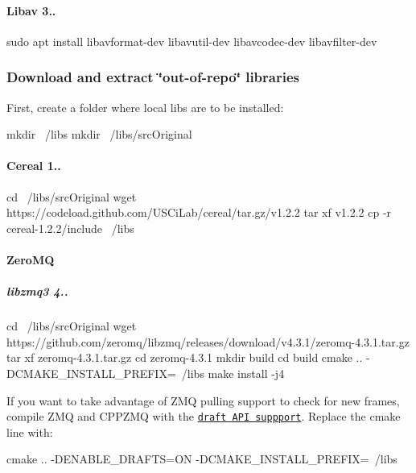  \paragraph*{Libav 3..}


\begin{DoxyCode}
sudo apt install libavformat-dev libavutil-dev libavcodec-dev libavfilter-dev
\end{DoxyCode}


\subsubsection*{Download and extract \char`\"{}out-\/of-\/repo\char`\"{} libraries}

First, create a folder where local libs are to be installed\+:


\begin{DoxyCode}
mkdir ~/libs
mkdir ~/libs/srcOriginal
\end{DoxyCode}


\paragraph*{Cereal 1..}


\begin{DoxyCode}
cd ~/libs/srcOriginal
wget https://codeload.github.com/USCiLab/cereal/tar.gz/v1.2.2
tar xf v1.2.2
cp -r cereal-1.2.2/include ~/libs
\end{DoxyCode}


\paragraph*{Zero\+MQ}

\subparagraph*{libzmq3 4..}


\begin{DoxyCode}
cd ~/libs/srcOriginal
wget https://github.com/zeromq/libzmq/releases/download/v4.3.1/zeromq-4.3.1.tar.gz
tar xf zeromq-4.3.1.tar.gz
cd zeromq-4.3.1
mkdir build
cd build
cmake .. -DCMAKE\_INSTALL\_PREFIX=~/libs
make install -j4
\end{DoxyCode}


If you want to take advantage of Z\+MQ pulling support to check for new frames, compile Z\+MQ and C\+P\+P\+Z\+MQ with the \href{https://github.com/zeromq/cppzmq/issues/175}{\tt draft A\+PI suppport}. Replace the cmake line with\+:


\begin{DoxyCode}
cmake .. -DENABLE\_DRAFTS=ON -DCMAKE\_INSTALL\_PREFIX=~/libs
\end{DoxyCode}


